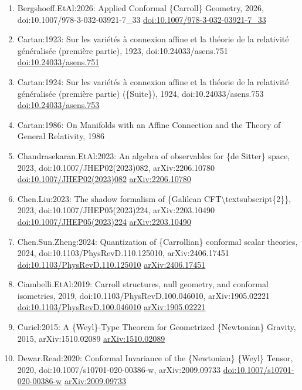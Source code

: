 \documentclass[11pt]{article}
\begin{document}
\begin{enumerate}[leftmargin=*]
  \item Bergshoeff.EtAl:2026: Applied Conformal \{Carroll\} Geometry, 2026, doi:10.1007/978-3-032-03921-7\_33 \href{https://doi.org/10.1007/978-3-032-03921-7\_33}{doi:10.1007/978-3-032-03921-7\_33}
  \item Cartan:1923: Sur les variétés à connexion affine et la théorie de la relativité généralisée (première partie), 1923, doi:10.24033/asens.751 \href{https://doi.org/10.24033/asens.751}{doi:10.24033/asens.751}
  \item Cartan:1924: Sur les variétés à connexion affine et la théorie de la relativité généralisée (première partie) (\{Suite\}), 1924, doi:10.24033/asens.753 \href{https://doi.org/10.24033/asens.753}{doi:10.24033/asens.753}
  \item Cartan:1986: On Manifolds with an Affine Connection and the Theory of General Relativity, 1986
  \item Chandrasekaran.EtAl:2023: An algebra of observables for \{de Sitter\} space, 2023, doi:10.1007/JHEP02(2023)082, arXiv:2206.10780 \href{https://doi.org/10.1007/JHEP02(2023)082}{doi:10.1007/JHEP02(2023)082} \href{https://arxiv.org/abs/2206.10780}{arXiv:2206.10780}
  \item Chen.Liu:2023: The shadow formalism of \{Galilean CFT\textbackslash{}textsubscript\{2\}\}, 2023, doi:10.1007/JHEP05(2023)224, arXiv:2203.10490 \href{https://doi.org/10.1007/JHEP05(2023)224}{doi:10.1007/JHEP05(2023)224} \href{https://arxiv.org/abs/2203.10490}{arXiv:2203.10490}
  \item Chen.Sun.Zheng:2024: Quantization of \{Carrollian\} conformal scalar theories, 2024, doi:10.1103/PhysRevD.110.125010, arXiv:2406.17451 \href{https://doi.org/10.1103/PhysRevD.110.125010}{doi:10.1103/PhysRevD.110.125010} \href{https://arxiv.org/abs/2406.17451}{arXiv:2406.17451}
  \item Ciambelli.EtAl:2019: Carroll structures, null geometry, and conformal isometries, 2019, doi:10.1103/PhysRevD.100.046010, arXiv:1905.02221 \href{https://doi.org/10.1103/PhysRevD.100.046010}{doi:10.1103/PhysRevD.100.046010} \href{https://arxiv.org/abs/1905.02221}{arXiv:1905.02221}
  \item Curiel:2015: A \{Weyl\}-Type Theorem for Geometrized \{Newtonian\} Gravity, 2015, arXiv:1510.02089 \href{https://arxiv.org/abs/1510.02089}{arXiv:1510.02089}
  \item Dewar.Read:2020: Conformal Invariance of the \{Newtonian\} \{Weyl\} Tensor, 2020, doi:10.1007/s10701-020-00386-w, arXiv:2009.09733 \href{https://doi.org/10.1007/s10701-020-00386-w}{doi:10.1007/s10701-020-00386-w} \href{https://arxiv.org/abs/2009.09733}{arXiv:2009.09733}

\end{enumerate}
\end{document}

